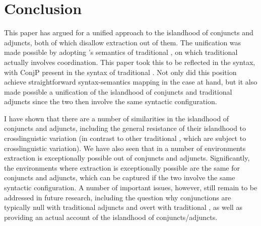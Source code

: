 \documentclass[output=paper]{langsci/langscibook}
\begin{document}
\section{Conclusion}\label{sec:35.6}

This paper has argued for a unified approach to the islandhood of conjuncts and
adjuncts, both of which disallow extraction out of them. The unification was
made possible by adopting \citeauthor{Higginbotham1985}’s semantics of
traditional , on which traditional  actually involves
coordination. This paper took this to be reflected in the syntax, with ConjP
present in the syntax of traditional  \parencite[see
also][]{Progovac1998,Progovac1999}. Not only did this position achieve
straightforward syntax-semantics mapping in the case at hand, but it also made
possible a unification of the islandhood of conjuncts and traditional adjuncts
since the two then involve the same syntactic configuration.

I have shown that there are a number of similarities in the islandhood of
conjuncts and adjuncts, including the general resistance of their islandhood to
crosslinguistic variation (in contrast to other traditional , which are
subject to crosslinguistic variation). We have also seen that in a number of
environments extraction is exceptionally possible out of conjuncts and
adjuncts. Significantly, the environments where extraction is exceptionally
possible are the same for conjuncts and adjuncts, which can be captured if the
two involve the same syntactic configuration. A number of important issues,
however, still remain to be addressed in future research, including the
question why conjunctions are typically null with traditional adjuncts and
overt with traditional , as well as providing an actual account of
the islandhood of conjuncts/adjuncts.
\end{document}
